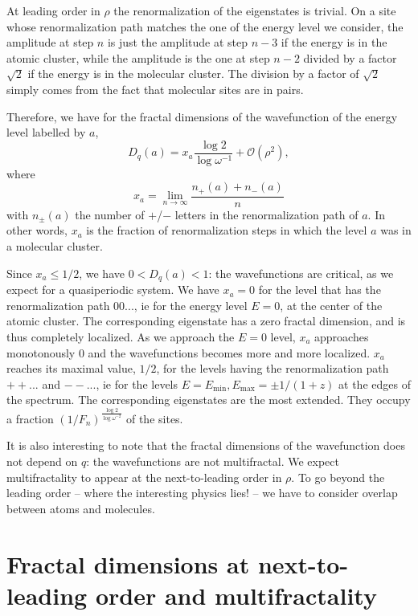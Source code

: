 \documentclass[11pt]{article}
\begin{document}
At leading order in $\rho$ the renormalization of the eigenstates is trivial. 
On a site whose renormalization path matches the one of the energy level we consider, the amplitude at step $n$ is just the amplitude at step $n-3$ if the energy is in the atomic cluster, while the amplitude is the one at step $n-2$ divided by a factor $\sqrt{2}$ if the energy is in the molecular cluster.
The division by a factor of $\sqrt{2}$ simply comes from the fact that molecular sites are in pairs.

Therefore, we have for the fractal dimensions of the wavefunction of the energy level labelled by $a$,
\begin{equation}
\label{eq:dqpsi0}
	D_q(a) = x_a \frac{\log 2}{\log \omega^{-1}} + \mathcal{O}(\rho^2),
\end{equation}
where
\begin{equation}
	x_a = \lim_{n \rightarrow \infty} \frac{n_+(a)+n_-(a)}{n}
\end{equation}
with $n_\pm(a)$ the number of $+$/$-$ letters in the renormalization path of $a$.
In other words, $x_a$ is the fraction of renormalization steps in which the level $a$ was in a molecular cluster.

Since $x_a \leq 1/2$, we have $0 < D_q(a) < 1$: the wavefunctions are critical, as we expect for a quasiperiodic system.
We have $x_a = 0$ for the level that has the renormalization path $00...$, ie for the energy level $E=0$, at the center of the atomic cluster. The corresponding eigenstate has a zero fractal dimension, and is thus completely localized. As we approach the $E=0$ level, $x_a$ approaches monotonously $0$ and the wavefunctions becomes more and more localized.
$x_a$ reaches its maximal value, $1/2$, for the levels having the renormalization path $++...$ and $--...$, ie for the levels $E=E_\text{min}, E_\text{max} = \pm 1/(1+z)$ at the edges of the spectrum.
The corresponding eigenstates are the most extended. They occupy a fraction $(1/F_n)^{\frac{\log 2}{\log \omega^{-2}}}$ of the sites.

It is also interesting to note that the fractal dimensions of the wavefunction does not depend on $q$: the wavefunctions are not multifractal.
We expect multifractality to appear at the next-to-leading order in $\rho$.
To go beyond the leading order -- where the interesting physics lies! -- we have to consider overlap between atoms and molecules.

\section{Fractal dimensions at next-to-leading order and multifractality}
 
\end{document}
